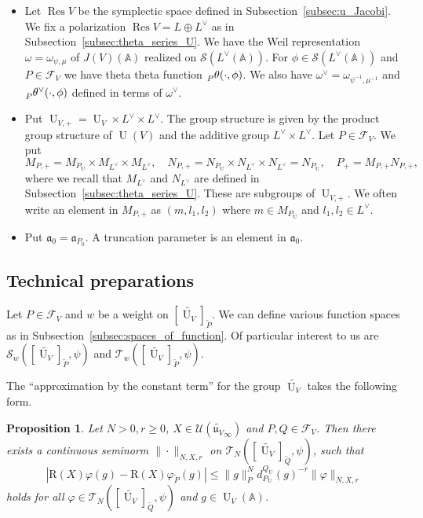 \documentclass[letterpaper,11pt]{amsart}
\newcommand{\fa}{\mathfrak{a}}
\newcommand{\fu}{\mathfrak{u}}
\newcommand{\bA}{\mathbb{A}}
\newcommand{\cF}{\mathcal{F}}
\newcommand{\cS}{\mathcal{S}}
\newcommand{\cT}{\mathcal{T}}
\newcommand{\cU}{\mathcal{U}}
\newcommand{\<}{\negthickspace}
\DeclareMathOperator{\U}{U}
\DeclareMathOperator{\Res}{Res}
\theoremstyle{definition}
\theoremstyle{plain}
\newtheorem{prop}[definition]{Proposition}
\theoremstyle{remark}
\numberwithin{equation}{section}
\begin{document}
\begin{itemize}
    \item  Let $\Res V$ be the symplectic space defined in
        Subsection~\ref{subsec:u_Jacobi}. We fix a polarization
        $\Res V= L \oplus L^\vee$ as in Subsection~\ref{subsec:theta_series_U}.
        We have the Weil representation $\omega = \omega_{\psi, \mu}$ of
        $J(V)(\bA)$ realized on $\cS(L^\vee(\bA))$. For $\phi \in \cS(L^\vee(\bA))$ and $P \in \cF_V$ we have theta theta function $\prescript{}{P}{\theta}(\cdot, \phi)$. We also have
        $\omega^\vee = \omega_{\psi^{-1}, \mu^{-1}}$ and $\prescript{}{P}{\theta}^\vee(\cdot, \phi)$ defined in terms of $\omega^\vee$.

    \item Put $\U_{V,+} = \U_V \times L^\vee \times L^\vee$.
        The group structure is given by the product group structure of
        $\U(V)$ and the additive group $L^\vee \times L^\vee$. Let $P \in \cF_V$.
        We put
            \[
            M_{P, +} = M_{P_{\U}} \times M_{L^\vee} \times M_{L^\vee}, \quad
            N_{P, +} = N_{P_{\U}} \times N_{L^\vee} \times N_{L^\vee} = N_{P_{\U}},\quad
            P_+ = M_{P, +} N_{P, +},
            \]
        where we recall that $M_{L^\vee}$ and $N_{L^\vee}$ are defined in Subsection~\ref{subsec:theta_series_U}.
        These are subgroups of $\U_{V, +}$. We often write an element in $M_{P, +}$
        as $(m, l_1, l_2)$ where $m \in M_{P_{\U}}$ and $l_1,l_2 \in L^\vee$.

    \item Put $\fa_0 = \fa_{P_0}$. A truncation parameter is an element in
        $\fa_0$.
\end{itemize}

\subsection{Technical preparations}

Let $P \in \cF_V$ and $w$ be a weight on $[\widetilde{\U_V}]_{\widetilde{P}}$.
We can define various function spaces as in
Subsection~\ref{subsec:spaces_of_function}. Of particular interest to us are
$\cS_w([\widetilde{\U_V}]_{\widetilde{P}}, \psi)$ and
$\cT_w([\widetilde{\U_V}]_{\widetilde{P}}, \psi)$.

The ``approximation by the constant term'' for the group $\widetilde{\U_V}$ takes the following form.

\begin{prop} \label{lem:tildeu_approximation_by_constant_term}
Let $N>0,r \ge 0$, $X \in \cU(\widetilde{\fu_{V}}_{\infty})$ and $P,Q \in
\cF_V$. Then there exists a continuous seminorm $\| \cdot \|_{N,X,r}$ on
$\cT_N([\widetilde{\U_V}]_{\widetilde{Q}},\psi)$, such that
    \[
    \left| \mathrm{R}(X)\varphi(g)-
    \mathrm{R}(X)\varphi_{\widetilde{P}}(g) \right|
    \le \| g \|^N_P d_{P_{\U}}^{Q_{\U}}(g)^{-r} \| \varphi \|_{N,X,r}
    \]
holds for all $\varphi \in \cT_N([\widetilde{\U_V}]_{\widetilde{Q}},\psi)$ and
$g \in \U_V(\bA)$.
\end{prop}
\end{document}
